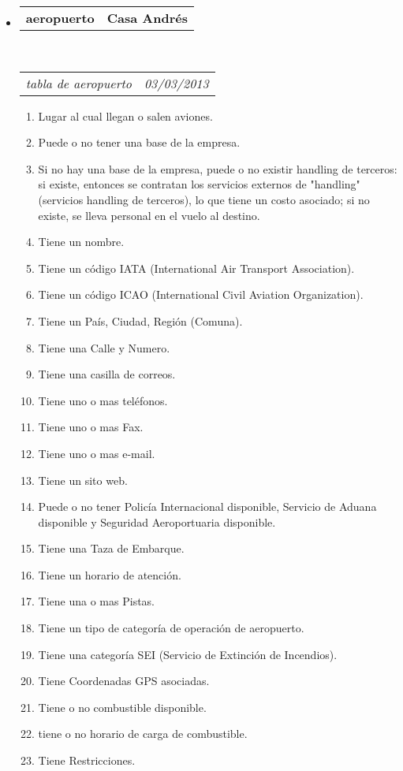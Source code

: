 \documentclass[10pt,letterpaper]{article}
\makeatletter
\newcommand{\headerrow}[2]
{\begin{tabular*}{\linewidth}{l@{\extracolsep{\fill}}r}
	#1 &
	#2 \\
\end{tabular*}}
\makeatother
\begin{document}
\begin{itemize}
	\parskip=0.1em

	\item
	\headerrow
		{\textbf{aeropuerto}}
		{\textbf{Casa Andrés}}
	\\
	\headerrow
		{\emph{tabla de aeropuerto}}
		{\emph{03/03/2013}}
	\begin{enumerate}
		\item Lugar al cual llegan o salen aviones.
		\item Puede o no tener una base de la empresa.
		\item Si no hay una base de la empresa, puede o no existir handling de terceros: si existe, entonces se contratan los servicios externos de "handling" (servicios handling de terceros), lo que tiene un costo asociado; si no existe, se lleva personal en el vuelo al destino.
		\item Tiene un nombre.
		\item Tiene un código IATA (International Air Transport Association).
		\item Tiene un código ICAO (International Civil Aviation Organization).
		\item Tiene un País, Ciudad, Región (Comuna).
		\item Tiene una Calle y Numero.
		\item Tiene una casilla de correos.
		\item Tiene uno o mas teléfonos.
		\item Tiene uno o mas Fax.
		\item Tiene uno o mas e-mail.
		\item Tiene un sito web.
		\item Puede o no tener Policía Internacional disponible, Servicio de Aduana disponible y Seguridad Aeroportuaria disponible.
		\item Tiene una Taza de Embarque.
		\item Tiene un horario de atención.
		\item Tiene una o mas Pistas.
		\item Tiene un tipo de categoría de operación de aeropuerto.
		\item Tiene una categoría SEI (Servicio de Extinción de Incendios).
		\item Tiene Coordenadas GPS asociadas.
		\item Tiene o no combustible disponible.
		\item tiene o no horario de carga de combustible.
		\item Tiene Restricciones.
	\end{enumerate}

\end{itemize}
\end{document}
